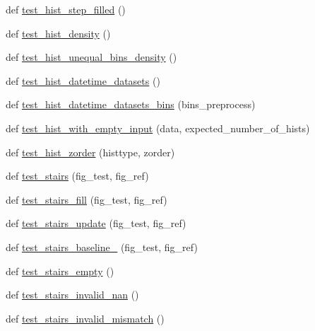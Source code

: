\begin{DoxyCompactItemize}
def \hyperlink{namespacematplotlib_1_1tests_1_1test__axes_add515c5c7b5fdea55748af858886539e}{test\+\_\+hist\+\_\+step\+\_\+filled} ()
\item 
def \hyperlink{namespacematplotlib_1_1tests_1_1test__axes_a21eb6ceafbc4cf2bebe021e1368af6ee}{test\+\_\+hist\+\_\+density} ()
\item 
def \hyperlink{namespacematplotlib_1_1tests_1_1test__axes_a9e49a3bc36dbd3ee6d70e3d9fa64317f}{test\+\_\+hist\+\_\+unequal\+\_\+bins\+\_\+density} ()
\item 
def \hyperlink{namespacematplotlib_1_1tests_1_1test__axes_a3c694237caf23682865ed5ea28252523}{test\+\_\+hist\+\_\+datetime\+\_\+datasets} ()
\item 
def \hyperlink{namespacematplotlib_1_1tests_1_1test__axes_ae0aaeeb65f7649bd46e372f6c89f2dd9}{test\+\_\+hist\+\_\+datetime\+\_\+datasets\+\_\+bins} (bins\+\_\+preprocess)
\item 
def \hyperlink{namespacematplotlib_1_1tests_1_1test__axes_ac608549073d23d43a6f17ac3a9364d7c}{test\+\_\+hist\+\_\+with\+\_\+empty\+\_\+input} (data, expected\+\_\+number\+\_\+of\+\_\+hists)
\item 
def \hyperlink{namespacematplotlib_1_1tests_1_1test__axes_a717db0267b4ee5981f03192a66fe7607}{test\+\_\+hist\+\_\+zorder} (histtype, zorder)
\item 
def \hyperlink{namespacematplotlib_1_1tests_1_1test__axes_ad09dfa240e16d16ec2008f643710b87c}{test\+\_\+stairs} (fig\+\_\+test, fig\+\_\+ref)
\item 
def \hyperlink{namespacematplotlib_1_1tests_1_1test__axes_a9084eeb87b77a45ff492405e00a9594b}{test\+\_\+stairs\+\_\+fill} (fig\+\_\+test, fig\+\_\+ref)
\item 
def \hyperlink{namespacematplotlib_1_1tests_1_1test__axes_ad3a665f58d671324a7d423d419b8d00c}{test\+\_\+stairs\+\_\+update} (fig\+\_\+test, fig\+\_\+ref)
\item 
def \hyperlink{namespacematplotlib_1_1tests_1_1test__axes_aa0ad90c199864fab6474d31dfdf8930b}{test\+\_\+stairs\+\_\+baseline\+\_} (fig\+\_\+test, fig\+\_\+ref)
\item 
def \hyperlink{namespacematplotlib_1_1tests_1_1test__axes_a0b2cbc4779329a111f06d64171049b80}{test\+\_\+stairs\+\_\+empty} ()
\item 
def \hyperlink{namespacematplotlib_1_1tests_1_1test__axes_aae5b9ffb08034f8036d7c61041774c95}{test\+\_\+stairs\+\_\+invalid\+\_\+nan} ()
\item 
def \hyperlink{namespacematplotlib_1_1tests_1_1test__axes_a778e003420d49f9dc4474f16ad1a7ee0}{test\+\_\+stairs\+\_\+invalid\+\_\+mismatch} ()

\end{DoxyCompactItemize}
